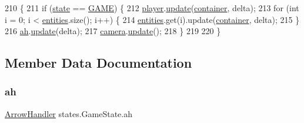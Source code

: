 \begin{DoxyCode}
210                                                                                                       \{
211         \textcolor{keywordflow}{if} (\mbox{\hyperlink{classstates_1_1_game_state_a5e07b1776e13d009e1a8c6a1e8140d04}{state}} == \mbox{\hyperlink{classstates_1_1_game_state_a8617f1d8be7bed020eeab9384e731bc6}{GAME}}) \{
212             \mbox{\hyperlink{classstates_1_1_game_state_ae8ec891c55e1c5d43372a289d8a6d87e}{player}}.\mbox{\hyperlink{classentities_1_1_player_abd693dd7c24c59d268906f115f9a4a3b}{update}}(\mbox{\hyperlink{classstates_1_1_game_state_a88b0df4b57ada742c53e4e1ee3b25827}{container}}, delta);
213             \textcolor{keywordflow}{for} (\textcolor{keywordtype}{int} i = 0; i < \mbox{\hyperlink{namespaceentities}{entities}}.size(); i++) \{
214                 \mbox{\hyperlink{namespaceentities}{entities}}.get(i).update(\mbox{\hyperlink{classstates_1_1_game_state_a88b0df4b57ada742c53e4e1ee3b25827}{container}}, delta);
215             \}
216             \mbox{\hyperlink{classstates_1_1_game_state_ad403f3cc9e4c649012a647fe88ada09f}{ah}}.\mbox{\hyperlink{classitems_1_1weapons_1_1_arrow_handler_a64a0233c91c8aef9289012c67bdf6874}{update}}(delta);
217             \mbox{\hyperlink{classstates_1_1_game_state_a0ed0ff756171316575f1bb875591b14d}{camera}}.\mbox{\hyperlink{classentities_1_1_camera_afc9fce5bc7a2d64ca42a04c5f34f6f8c}{update}}();
218         \}
219 
220     \}
\end{DoxyCode}


\subsection{Member Data Documentation}
\mbox{\label{classstates_1_1_game_state_ad403f3cc9e4c649012a647fe88ada09f}} 
\subsubsection{\texorpdfstring{ah}{ah}}
{\footnotesize\ttfamily \mbox{\hyperlink{classitems_1_1weapons_1_1_arrow_handler}{Arrow\+Handler}} states.\+Game\+State.\+ah\hspace{0.3cm}{\ttfamily [private]}}

\mbox{\label{classstates_1_1_game_state_a0ed0ff756171316575f1bb875591b14d}} 
